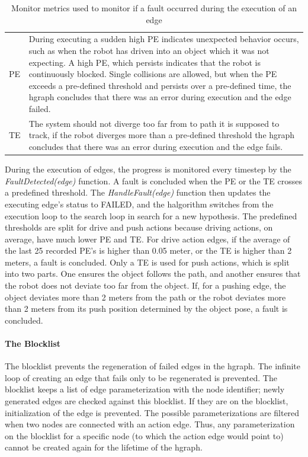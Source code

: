 \noindent
\begin{table}[H]
\centering
\begin{tabular}%
  {>{\raggedleft\arraybackslash}p{}%
   >{\raggedright\arraybackslash}p{}}
\acf{PE}&  During executing a sudden high \ac{PE} indicates unexpected behavior occurs, such as when the robot has driven into an object which it was not expecting. A high \ac{PE}, which persists indicates that the robot is continuously blocked. Single collisions are allowed, but when the \ac{PE} exceeds a pre-defined threshold and persists over a pre-defined time, the \ac{hgraph} concludes that there was an error during execution and the edge failed.\\
\acf{TE}& The system should not diverge too far from to path it is supposed to track, if the robot diverges more than a pre-defined threshold the \ac{hgraph} concludes that there was an error during execution and the edge fails. \\
\end{tabular}
\caption{Monitor metrics used to monitor if a fault occurred during the execution of an edge}%
\label{table:monitoring_edge_metrics}
\end{table}
During the execution of edges, the progress is monitored every timestep by the \textit{FaultDetected(\gls{edge})} function. A fault is concluded when the \acf{PE} or the \acf{TE} crosses a predefined threshold. The \textit{HandleFault(\gls{edge})} function then updates the executing edge's status to FAILED, and the \ac{halgorithm} switches from the execution loop to the search loop in search for a new hypothesis. The predefined thresholds are split for drive and push actions because driving actions, on average, have much lower \ac{PE} and \ac{TE}. For drive action edges, if the average of the last 25 recorded \ac{PE}'s is higher than 0.05 meter, or the \ac{TE} is higher than 2 meters, a fault is concluded. Only a \ac{TE} is used for push actions, which is split into two parts. One ensures the object follows the path, and another ensures that the robot does not deviate too far from the object. If, for a pushing edge, the object deviates more than 2 meters from the path or the robot deviates more than 2 meters from its push position determined by the object pose, a fault is concluded.\bs

\paragraph{The Blocklist}%
The blocklist prevents the regeneration of failed edges in the \ac{hgraph}. The infinite loop of creating an edge that fails only to be regenerated is prevented. The blocklist keeps a list of edge parameterization with the node identifier; newly generated edges are checked against this blocklist. If they are on the blocklist, initialization of the edge is prevented. The possible parameterizations are filtered when two nodes are connected with an action edge. Thus, any parameterization on the blocklist for a specific node (to which the action edge would point to) cannot be created again for the lifetime of the \ac{hgraph}.\bs

